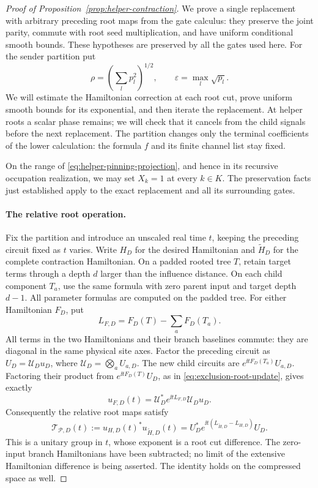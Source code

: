 \begin{proof}[Proof of Proposition~\ref{prop:helper-contraction}]
We prove a single replacement with arbitrary preceding root maps
from the gate calculus: they preserve the joint parity, commute with
root seed multiplication, and have uniform conditional smooth bounds.
These hypotheses are preserved by all the gates used here.  For the
sender partition put
\[
 \rho=\left(\sum_l p_l^2\right)^{1/2},\qquad
 \varepsilon=\max_l\sqrt{p_l}.
\]
We will estimate the Hamiltonian correction at each root cut, prove
uniform smooth bounds for its exponential, and then iterate the
replacement.  At helper roots a scalar phase remains; we will check
that it cancels from the child signals before the next replacement.
The partition changes only the terminal coefficients of the lower
calculation: the formula \(f\) and its finite channel list stay fixed.

On the range of \eqref{eq:helper-pinning-projection}, and hence in its
recursive occupation realization, we may set \(X_k=1\) at every
\(k\in K\).  The preservation facts just established apply to the
exact replacement and all its surrounding gates.

\paragraph{The relative root operation.}
Fix the partition and introduce an unscaled real time \(t\), keeping
the preceding circuit fixed as \(t\) varies.  Write \(H_D\) for the desired Hamiltonian and \(\widetilde H_D\) for the
complete contraction Hamiltonian.  On a padded rooted tree \(T\),
retain target terms through a depth \(d\) larger than the influence
distance.  On each child component \(T_a\), use the same formula with
zero parent input and target depth \(d-1\).  All parameter formulas
are computed on the padded tree.  For either Hamiltonian \(F_D\), put
\[
 L_{F,D}=F_D(T)-\sum_a F_D(T_a).
\]
All terms in the two Hamiltonians and their branch baselines commute:
they are diagonal in the same physical site axes.  Factor the preceding
circuit as \(U_D=\mathcal U_Du_D\), where
\(\mathcal U_D=\bigotimes_aU_{a,D}\).  The new child circuits are
\(e^{\ii tF_D(T_a)}U_{a,D}\).  Factoring their product from
\(e^{\ii tF_D(T)}U_D\), as in
\eqref{eq:exclusion-root-update}, gives exactly
\[
 u_{F,D}(t)=\mathcal U_D^*e^{\ii tL_{F,D}}\mathcal U_Du_D.
\]
Consequently the relative root maps satisfy
\begin{equation}\label{eq:helper-relative-root-group}
 \mathcal T_{\mathcal P,D}(t)
 :=u_{H,D}(t)^*u_{\widetilde H,D}(t)
 =U_D^*e^{\ii t(L_{\widetilde H,D}-L_{H,D})}U_D.
\end{equation}
This is a unitary group in \(t\), whose exponent is a root cut
difference.  The zero-input branch Hamiltonians have been subtracted;
no limit of the extensive Hamiltonian difference is being asserted.
The identity holds on the compressed space as well.


\end{proof}
